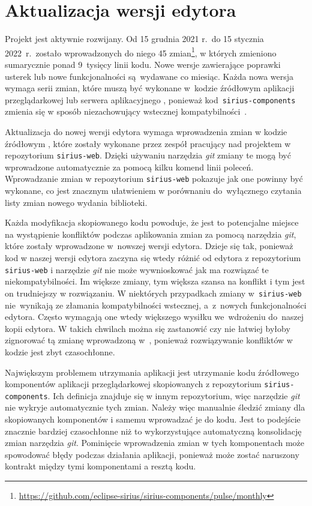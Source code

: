 \section{Aktualizacja wersji edytora}

Projekt \SiriusWeb{} jest aktywnie rozwijany. Od 15 grudnia 2021 r.\ do 15
stycznia 2022~r.\ zostało wprowadzonych do niego 45 zmian\footnote{
	\url{https://github.com/eclipse-sirius/sirius-components/pulse/monthly}
}, w których zmieniono sumarycznie ponad 9~tysięcy linii kodu.
Nowe wersje zawierające poprawki usterek lub nowe funkcjonalności są~wydawane
co miesiąc. Każda nowa wersja wymaga serii zmian, które muszą być wykonane
w~kodzie źródłowym aplikacji przeglądarkowej lub serwera aplikacyjnego
\SiriusWeb{}, ponieważ kod~\texttt{sirius-components} zmienia się w sposób
niezachowujący wstecznej kompatybilności~\cite{sirius-components-changelog}.

Aktualizacja do nowej wersji edytora wymaga wprowadzenia zmian w kodzie
źródłowym \SiriusWeb{}, które zostały wykonane przez zespół pracujący nad
projektem w repozytorium \texttt{sirius-web}. Dzięki używaniu narzędzia
\emph{git} zmiany te mogą być wprowadzone automatycznie za pomocą kilku komend
linii poleceń. Wprowadzanie zmian w repozytorium \texttt{sirius-web} pokazuje
jak one powinny być wykonane, co jest znacznym ułatwieniem w porównaniu
do~wyłącznego czytania listy zmian nowego wydania biblioteki.

Każda modyfikacja skopiowanego kodu \SiriusWeb{} powoduje, że jest to
potencjalne
miejsce na wystąpienie konfliktów podczas aplikowania zmian za pomocą narzędzia
\emph{git}, które zostały wprowadzone w~nowszej wersji edytora.
Dzieje się tak, ponieważ kod w naszej wersji edytora zaczyna się wtedy różnić
od edytora z repozytorium \texttt{sirius-web} i narzędzie \emph{git} nie może
wywnioskować jak ma rozwiązać te niekompatybilności.
Im większe zmiany, tym większa szansa na konflikt i tym jest on trudniejszy w
rozwiązaniu.
W niektórych przypadkach zmiany w~\texttt{sirius-web} nie~wynikają ze złamania
kompatybilności wstecznej, a~z~nowych funkcjonalności edytora. Często
wymagają one wtedy większego wysiłku we~wdrożeniu do~naszej kopii edytora.
W takich chwilach można się zastanowić czy nie łatwiej byłoby zignorować tą
zmianę wprowadzoną w~\SiriusWeb{}, ponieważ rozwiązywanie konfliktów w
kodzie jest zbyt czasochłonne.

Największym problemem utrzymania aplikacji \SiriusWeb{} jest utrzymanie
kodu źródłowego komponentów aplikacji przeglądarkowej skopiowanych z
repozytorium \texttt{sirius-components}. Ich definicja znajduje się w innym
repozytorium, więc narzędzie \emph{git} nie wykryje automatycznie tych zmian.
Należy więc manualnie śledzić zmiany dla skopiowanych komponentów i samemu
wprowadzać je do kodu. Jest to podejście znacznie bardziej czasochłonne
niż to wykorzystujące automatyczną konsolidację zmian narzędzia \emph{git}.
Pominięcie wprowadzenia zmian w tych komponentach może spowodować błędy podczas
działania aplikacji, ponieważ może zostać naruszony kontrakt między tymi
komponentami a resztą kodu.

